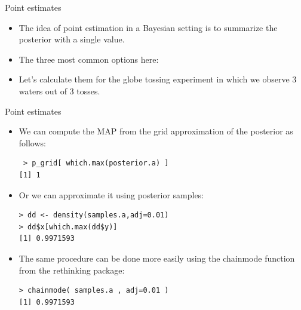 \documentclass[handout]{beamer}
\begin{document}
\begin{frame}{Point estimates}
\scriptsize{
\begin{itemize}

\item The idea of point estimation in a Bayesian setting is to summarize the posterior with a single value. 

\item The three most common options here:


\item Let's calculate them for the globe tossing experiment in which we observe 3 waters out of 3 tosses.



\end{itemize}



} 

\end{frame}



\begin{frame}[fragile]{Point estimates}
\scriptsize{
\begin{itemize}

\item We can compute the MAP from the grid approximation of the posterior as follows:

\begin{verbatim}
 > p_grid[ which.max(posterior.a) ]
[1] 1
\end{verbatim}


\item Or we can approximate it using posterior samples:

\begin{verbatim}
> dd <- density(samples.a,adj=0.01)
> dd$x[which.max(dd$y)]
[1] 0.9971593 
\end{verbatim}

\item The same procedure can be done more easily using the chainmode function from the rethinking package:

\begin{verbatim}
> chainmode( samples.a , adj=0.01 )
[1] 0.9971593 
\end{verbatim}





\end{itemize}



} 

\end{frame}
\end{document}
